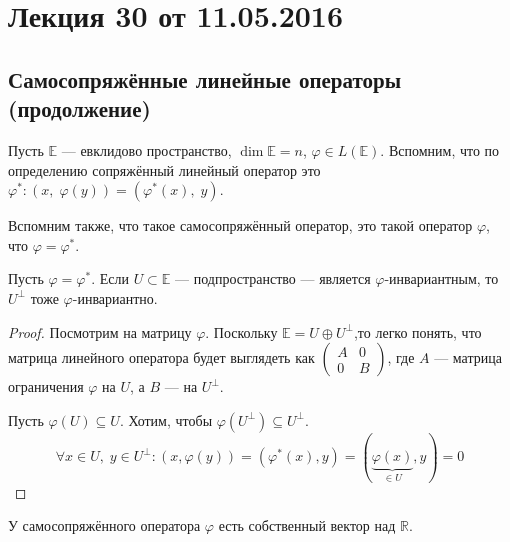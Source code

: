 


\section{Лекция 30 от 11.05.2016}

\subsection*{Самосопряжённые линейные операторы (продолжение)}

Пусть $\mathbb{E}$ --- евклидово пространство, $\dim \mathbb{E} = n$, $\varphi \in L(\mathbb{E})$. Вспомним, что по определению сопряжённый линейный оператор это $\varphi^*\colon (x,\;\varphi(y)) = (\varphi^*(x),\; y)$.

\par Вспомним также, что такое самосопряжённый оператор, это такой оператор $\varphi$, что $\varphi = \varphi^*$.

\begin{Suggestion}
	Пусть $\varphi = \varphi^*$. Если $U \subset \mathbb{E}$ --- подпространство --- является $\varphi$-инвариантным, то $U^\perp$ тоже $\varphi$-инвариантно.
\end{Suggestion}

\begin{proof}
	 Посмотрим на матрицу $\varphi$. Поскольку $\mathbb{E} = U \oplus U^\perp$,то легко понять, что матрица линейного оператора будет выглядеть как $\begin{pmatrix}
		A& 0\\
		0& B
	\end{pmatrix}$, где $A$ --- матрица ограничения $\varphi$ на $U$, а $B$ --- на $U^\perp$.
	
	\par Пусть $\varphi(U) \subseteq U$. Хотим, чтобы $\varphi(U^\perp) \subseteq U^\perp$. 
	\[
		\forall x \in U,\; y \in U^\perp\colon (x,\varphi(y)) = (\varphi^*(x), y) = (\underbrace{\varphi(x)}_{\in U}, y) = 0
	\]
\end{proof}

\begin{Suggestion}
	У самосопряжённого оператора $\varphi$ есть собственный вектор над $\mathbb{R}$. 
\end{Suggestion}

